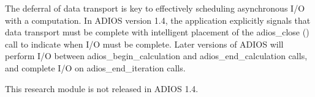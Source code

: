 The deferral of data transport is key to effectively scheduling asynchronous I/O 
with a computation. In ADIOS version 1.4, the application explicitly signals that 
data transport must be complete with intelligent placement of the adios\_close 
() call to indicate when I/O must be complete. Later versions of ADIOS will perform 
I/O between adios\_begin\_calculation and adios\_end\_calculation calls, and complete 
I/O on adios\_end\_iteration calls.

This research module is not released in ADIOS 1.4.
